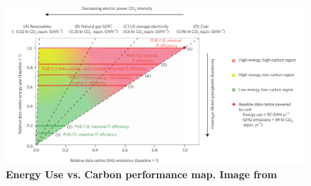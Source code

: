 \begin{figure} [!h]
\centering
\includegraphics[scale=.25]{methodology/images/masanet13a1.eps}
\caption{\textbf{Energy Use vs. Carbon performance map. Image from \cite{Masanet13a}}}
\label{masanet13a1}
\end{figure}